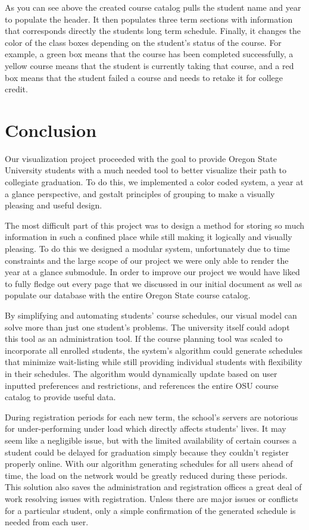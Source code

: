 \documentclass[journal]{vgtc}
\begin{document}
As you can see above the created course catalog pulls the student name and 
year to populate the header. It then populates three term sections with information that corresponds directly the students long term schedule. Finally, it changes the color of the class boxes depending on the student's status of the course. For example, a green box means that the course has been completed successfully, a yellow course means that the student is currently taking that course, and a red box means that the student failed a course and needs to retake it for college credit.

\section{Conclusion}
Our visualization project proceeded with the goal to provide Oregon State University students with a much needed tool to better visualize their path to collegiate graduation. To do this, we implemented a color coded system, a year at a glance perspective, and gestalt principles of grouping to make a visually pleasing and useful design. 

The most difficult part of this project was to design a method for storing so much information in such a confined place while still making it logically and visually pleasing. To do this we designed a modular system, unfortunately due to time constraints and the large scope of our project we were only able to render the year at a glance submodule. In order to improve our project we would have liked to fully fledge out every page that we discussed in our initial document as well as populate our database with the entire Oregon State course catalog.

By simplifying and automating students' course schedules, our visual model can solve more than just one student's problems. The university itself could adopt this tool as an administration tool. If the course planning tool was scaled to incorporate all enrolled students, the system's algorithm could generate schedules that minimize wait-listing while still providing individual students with flexibility in their schedules. The algorithm would dynamically update based on user inputted preferences and restrictions, and references the entire OSU course catalog to provide useful data. 

During registration periods for each new term, the school's servers are notorious for under-performing under load which directly affects students' lives. It may seem like a negligible issue, but with the limited availability of certain courses a student could be delayed for graduation simply because they couldn't register properly online. With our algorithm generating schedules for all users ahead of time, the load on the network would be greatly reduced during these periods. This solution also saves the administration and registration offices a great deal of work resolving issues with registration. Unless there are major issues or conflicts for a particular student, only a simple confirmation of the generated schedule is needed from each user. 
\end{document}
